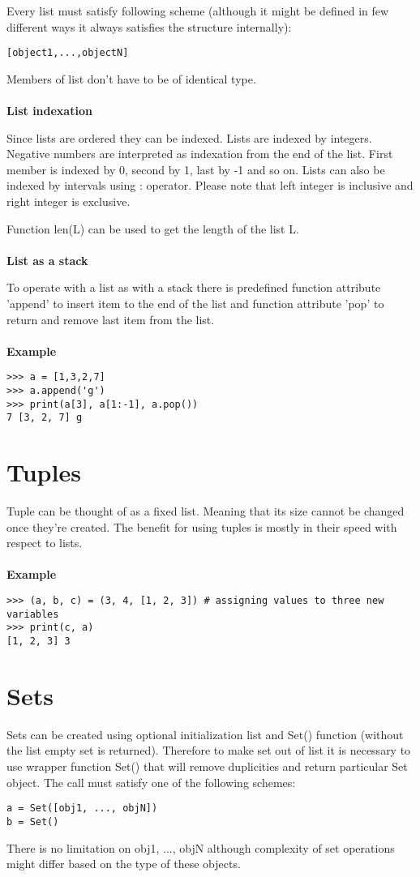 \documentclass[11pt,oneside]{fithesis2}
\newcommand{\markit}[1]{\ \\\\{\noindent\textbf{#1}}}
\begin{document}
Every list must satisfy following scheme (although it might be defined in few different ways it always satisfies the structure internally):
\begin{lstlisting}
[object1,...,objectN]
\end{lstlisting}
Members of list don't have to be of identical type.
\markit{List indexation}

Since lists are ordered they can be indexed. Lists are indexed by integers. Negative numbers are interpreted as indexation from the end of the list. First member is indexed by 0, second by 1, last by -1 and so on. Lists can also be indexed by intervals using : operator. Please note that left integer is inclusive and right integer is exclusive.

Function len(L) can be used to get the length of the list L.
\markit{List as a stack}

To operate with a list as with a stack there is predefined function attribute 'append' to insert item to the end of the list and function attribute 'pop' to return and remove last item from the list.
\markit{Example}
\begin{lstlisting}
>>> a = [1,3,2,7]
>>> a.append('g')
>>> print(a[3], a[1:-1], a.pop())
7 [3, 2, 7] g
\end{lstlisting}

\section{Tuples}
Tuple can be thought of as a fixed list. Meaning that its size cannot be changed once they're created. The benefit for using tuples is mostly in their speed with respect to lists.
\markit{Example}
\begin{lstlisting}
>>> (a, b, c) = (3, 4, [1, 2, 3]) # assigning values to three new variables
>>> print(c, a)
[1, 2, 3] 3
\end{lstlisting}

\section{Sets}
Sets can be created using optional initialization list and Set() function (without the list empty set is returned). Therefore to make set out of list it is necessary to use wrapper function Set() that will remove duplicities and return particular Set object. The call must satisfy one of the following schemes:
\begin{lstlisting}
a = Set([obj1, ..., objN])
b = Set()
\end{lstlisting}
There is no limitation on obj1, ..., objN although complexity of set operations might differ based on the type of these objects.
\end{document}
